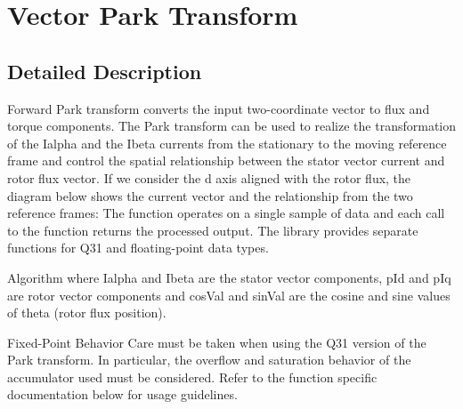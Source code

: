 \hypertarget{group__park}{}\section{Vector Park Transform}
\label{group__park}


\subsection{Detailed Description}
Forward Park transform converts the input two-\/coordinate vector to flux and torque components. The Park transform can be used to realize the transformation of the {\ttfamily Ialpha} and the {\ttfamily Ibeta} currents from the stationary to the moving reference frame and control the spatial relationship between the stator vector current and rotor flux vector. If we consider the d axis aligned with the rotor flux, the diagram below shows the current vector and the relationship from the two reference frames\+:  The function operates on a single sample of data and each call to the function returns the processed output. The library provides separate functions for Q31 and floating-\/point data types. \begin{DoxyParagraph}{Algorithm}
 where {\ttfamily Ialpha} and {\ttfamily Ibeta} are the stator vector components, {\ttfamily p\+Id} and {\ttfamily p\+Iq} are rotor vector components and {\ttfamily cos\+Val} and {\ttfamily sin\+Val} are the cosine and sine values of theta (rotor flux position). 
\end{DoxyParagraph}
\begin{DoxyParagraph}{Fixed-\/\+Point Behavior}
Care must be taken when using the Q31 version of the Park transform. In particular, the overflow and saturation behavior of the accumulator used must be considered. Refer to the function specific documentation below for usage guidelines. 
\end{DoxyParagraph}
